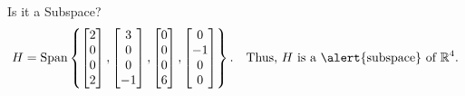 \documentclass[xcolor=dvipsnames,aspectratio=169,t]{beamer}
\begin{document}
\begin{frame}{Is it a Subspace?}
  \[ H = \mbox{Span} \left\{ \begin{bmatrix} 2 \\ 0 \\ 0 \\ 2 \end{bmatrix} , \begin{bmatrix} 3 \\ 0 \\ 0 \\ -1 \end{bmatrix} ,  \begin{bmatrix} 0 \\ 0 \\ 0 \\ 6 \end{bmatrix} ,  \begin{bmatrix} 0 \\ -1 \\ 0 \\ 0 \end{bmatrix} \right\}.
  \quad
  \text{Thus, $H$ is a \alert{subspace} of $\mathbb{R}^4$.}
  \]
\end{frame}
\end{document}
